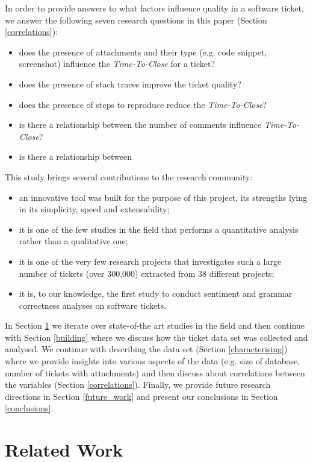 \documentclass{mpaper}
\begin{document}
In order to provide answers to what factors influence quality in a software ticket, we answer the following seven research 
questions in this paper (Section \ref{correlations}):
\begin{itemize}
  \item does the presence of attachments and their type (e.g. code snippet, screenshot) influence the \emph{Time-To-Close} for 
  a ticket?
  \item does the presence of stack traces improve the ticket quality?
  \item does the presence of steps to reproduce reduce the \emph{Time-To-Close}?
  \item is there a relationship between the number of comments influence \emph{Time-To-Close}?
  \item is there a relationship between 
\end{itemize}

This study brings several contributions to the research community:
\begin{itemize}
  \item an innovative tool was built for the purpose of this project, its strengths lying in its simplicity, speed and
  extensability;
  \item it is one of the few studies in the field that performs a quantitative analysis rather than a qualitative one;
  \item it is one of the very few research projects that investigates such a large number of tickets (over 300,000)
  extracted from 38 different projects;
  \item it is, to our knowledge, the first study to conduct sentiment and grammar correctness analyses on software tickets.
\end{itemize}

In Section \ref{related_work} we iterate over state-of-the art studies in the field and then continue with 
Section \ref{building} where we discuss how the ticket data set was collected and analysed. We continue with describing 
the data set (Section \ref{characterising}) where we provide insights into various aspects of the data (e.g. size of database,
number of tickets with attachments) and then discuss about correlations between the variables (Section \ref{correlations}).
Finally, we provide future research directions in Section \ref{future_work} and present our conclusions in Section \ref{conclusions}.

\section{Related Work}\label{related_work}
\end{document}
